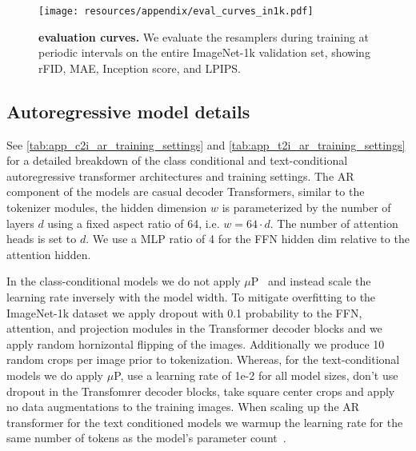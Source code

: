 \begin{figure*}[h]
\centering
\texttt{[image: resources/appendix/eval\_curves\_in1k.pdf]}
\caption{
\textbf{\ours evaluation curves.} We evaluate the resamplers during training at periodic intervals on the entire ImageNet-1k validation set, showing rFID, MAE, Inception score, and LPIPS.
}
\label{fig:resampler_eval_curves_in1k}
\end{figure*}


\subsection{Autoregressive model details}
\label{sec:app_ar_training_details}

See \cref{tab:app_c2i_ar_training_settings} and \cref{tab:app_t2i_ar_training_settings} for a detailed breakdown of the class conditional and text-conditional autoregressive transformer architectures and training settings. The AR component of the models are casual decoder Transformers, similar to the \ours tokenizer modules, the hidden dimension $w$ is parameterized by the number of layers $d$ using a fixed aspect ratio of 64, i.e. $w = 64 \cdot d$. The number of attention heads is set to $d$. We use a MLP ratio of 4 for the FFN hidden dim relative to the attention hidden. 

In the class-conditional models we do not apply $\mu$P~\cite{Yang2022muP} and instead scale the learning rate inversely with the model width. To mitigate overfitting to the ImageNet-1k dataset we apply dropout with 0.1 probability to the FFN, attention, and projection modules in the Transformer decoder blocks and we apply random hornizontal flipping of the images. Additionally we produce 10 random crops per image prior to tokenization\cite{sun2024autoregressive}. Whereas, for the text-conditional models we do apply $\mu$P, use a learning rate of 1e-2 for all model sizes, don't use dropout in the Transfomrer decoder blocks, take square center crops and apply no data augmentations to the training images. When scaling up the AR transformer for the text conditioned models we warmup the learning rate for the same number of tokens as the model's parameter count~\cite{porian2024resolving}.


